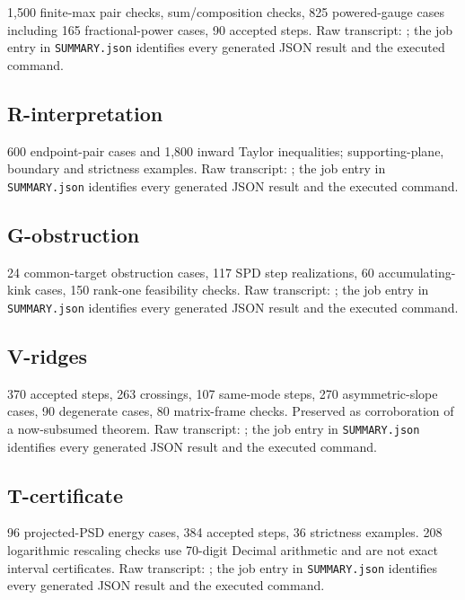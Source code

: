 1,500 finite-max pair checks, sum/composition checks, 825 powered-gauge cases including 165 fractional-power cases, 90 accepted steps. Raw transcript: ; the job entry in \texttt{SUMMARY.json} identifies every generated JSON result and the executed command.

\subsection{R-interpretation}\label{r-interpretation}

600 endpoint-pair cases and 1,800 inward Taylor inequalities; supporting-plane, boundary and strictness examples. Raw transcript: ; the job entry in \texttt{SUMMARY.json} identifies every generated JSON result and the executed command.

\subsection{G-obstruction}\label{g-obstruction}

24 common-target obstruction cases, 117 SPD step realizations, 60 accumulating-kink cases, 150 rank-one feasibility checks. Raw transcript: ; the job entry in \texttt{SUMMARY.json} identifies every generated JSON result and the executed command.

\subsection{V-ridges}\label{v-ridges}

370 accepted steps, 263 crossings, 107 same-mode steps, 270 asymmetric-slope cases, 90 degenerate cases, 80 matrix-frame checks. Preserved as corroboration of a now-subsumed theorem. Raw transcript: ; the job entry in \texttt{SUMMARY.json} identifies every generated JSON result and the executed command.

\subsection{T-certificate}\label{t-certificate}

96 projected-PSD energy cases, 384 accepted steps, 36 strictness examples. 208 logarithmic rescaling checks use 70-digit Decimal arithmetic and are not exact interval certificates. Raw transcript: ; the job entry in \texttt{SUMMARY.json} identifies every generated JSON result and the executed command.

